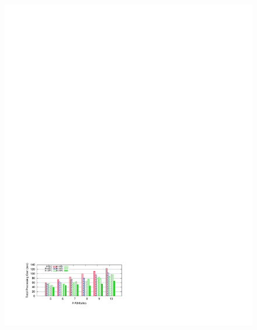 \begin{figure}[ht]
\begin{center}
{            \includegraphics[trim=1.8cm 2.2cm 11cm 23cm]{Figures/holistic/random_per_ma}
        }\vspace{-0.45 in}\\%
\end{center}
\end{figure}
